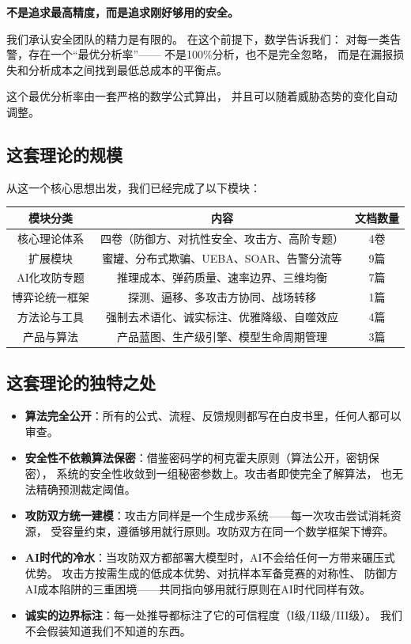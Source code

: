 \documentclass[11pt,a4paper]{article}
\begin{document}
\textbf{不是追求最高精度，而是追求刚好够用的安全。}

我们承认安全团队的精力是有限的。
在这个前提下，数学告诉我们：
对每一类告警，存在一个“最优分析率”——
不是100\%分析，也不是完全忽略，
而是在漏报损失和分析成本之间找到最低总成本的平衡点。

这个最优分析率由一套严格的数学公式算出，
并且可以随着威胁态势的变化自动调整。

\subsection{这套理论的规模}

从这一个核心思想出发，我们已经完成了以下模块：

\begin{center}
\begin{tabular}{c|c|c}
\toprule
\textbf{模块分类} & \textbf{内容} & \textbf{文档数量} \\
\midrule
核心理论体系 & 四卷（防御方、对抗性安全、攻击方、高阶专题） & 4卷 \\
扩展模块 & 蜜罐、分布式欺骗、UEBA、SOAR、告警分流等 & 9篇 \\
AI化攻防专题 & 推理成本、弹药质量、速率边界、三维均衡 & 7篇 \\
博弈论统一框架 & 探测、逼移、多攻击方协同、战场转移 & 1篇 \\
方法论与工具 & 强制去术语化、诚实标注、优雅降级、自噬效应 & 4篇 \\
产品与算法 & 产品蓝图、生产级引擎、模型生命周期管理 & 3篇 \\
\bottomrule
\end{tabular}
\end{center}

\subsection{这套理论的独特之处}

\begin{itemize}
    \item \textbf{算法完全公开}：所有的公式、流程、反馈规则都写在白皮书里，任何人都可以审查。
    \item \textbf{安全性不依赖算法保密}：借鉴密码学的柯克霍夫原则（算法公开，密钥保密），
          系统的安全性收敛到一组秘密参数上。攻击者即使完全了解算法，
          也无法精确预测裁定阈值。
    \item \textbf{攻防双方统一建模}：攻击方同样是一个生成步系统——每一次攻击尝试消耗资源，
          受容量约束，遵循够用就行原则。攻防双方在同一个数学框架下博弈。
    \item \textbf{AI时代的冷水}：当攻防双方都部署大模型时，AI不会给任何一方带来碾压式优势。
          攻击方按需生成的低成本优势、对抗样本军备竞赛的对称性、
          防御方AI成本陷阱的三重困境——共同指向够用就行原则在AI时代同样有效。
    \item \textbf{诚实的边界标注}：每一处推导都标注了它的可信程度（I级/II级/III级）。
          我们不会假装知道我们不知道的东西。
\end{itemize}
\end{document}
